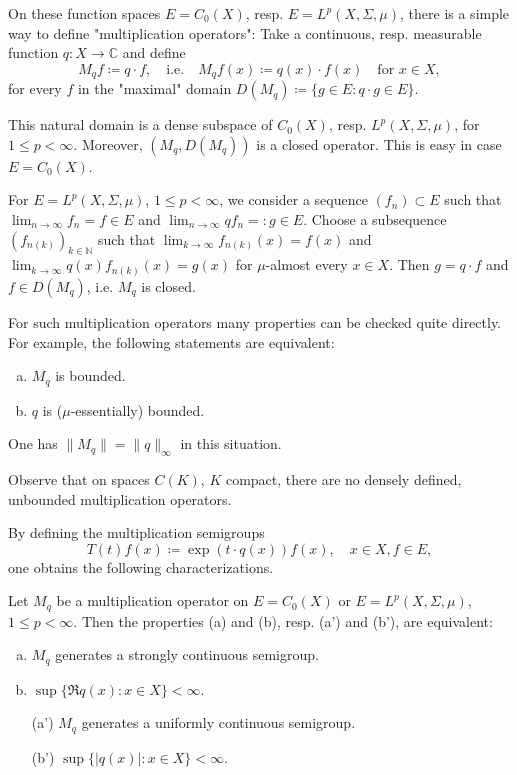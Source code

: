 On these function spaces $E = C_{0}(X)$, resp. $E = L^{p}(X,\Sigma,\mu)$, there is a simple way to define "multiplication operators": Take a continuous, resp. measurable function $q \colon X \to \mathbb{C}$ and define
\[
    M_{q}f \coloneqq q \cdot f, \quad \text{i.e.} \quad M_{q}f(x) 
    \coloneqq q(x) 	\cdot f(x) \quad \text{for } x \in X,
\]
for every $f$ in the "maximal" domain $D(M_{q}) \coloneqq \{g \in E : q \cdot g \in E\}$.

This natural domain is a dense subspace of $C_{0}(X)$, resp. $L^{p}(X,\Sigma,\mu)$, for $1 \leq p < \infty$.
Moreover, $(M_{q},D(M_{q}))$ is a closed operator.
This is easy in case $E = C_{0}(X)$.

For $E = L^{p}(X,\Sigma,\mu)$, $1 \leq p < \infty$, we consider a sequence $(f_{n}) \subset E$ such that $\lim_{n \to \infty} f_{n} = f \in E$ and $\lim_{n \to \infty} qf_{n} =: g \in E$.
Choose a subsequence $(f_{n(k)})_{k \in \mathbb{N}}$ such that $\lim_{k \to \infty} f_{n(k)}(x) = f(x)$ and $\lim_{k \to \infty} q(x)f_{n(k)}(x) = g(x)$ for $\mu$-almost every $x \in X$.
Then $g = q \cdot f$ and $f \in D(M_{q})$, i.e. $M_{q}$ is closed.

For such multiplication operators many properties can be checked quite directly.
For example, the following statements are equivalent:
\begin{enumerate}[(a)]
\item 
$M_{q}$ is bounded.

\item 
$q$ is ($\mu$-essentially) bounded.
\end{enumerate}
One has $\|M_{q}\| = \|q\|_{\infty}$ in this situation.

Observe that on spaces $C(K)$, $K$ compact, there are no densely defined, unbounded multiplication operators.

By defining the multiplication semigroups
\[
    T(t)f(x) \coloneqq \exp(t \cdot q(x))f(x), \quad x \in X, f \in E,
\]
one obtains the following characterizations.

\begin{proposition}\label{prop:a1-2.3}
Let $M_{q}$ be a multiplication operator on $E = C_{0}(X)$ or $E = L^{p}(X,\Sigma,\mu)$, $1 \leq p < \infty$.
Then the properties (a) and (b), resp. (a') and (b'), are equivalent:
\begin{enumerate}[(a)]
\item 
$M_{q}$ generates a strongly continuous semigroup.

\item 
$\sup\{\Re q(x): x \in X \} < \infty$.

\item[(a')] 
$M_{q}$ generates a uniformly continuous semigroup.

\item[(b')] 
$\sup\{|q(x)|: x \in X \} < \infty$.
\end{enumerate}
\end{proposition}

